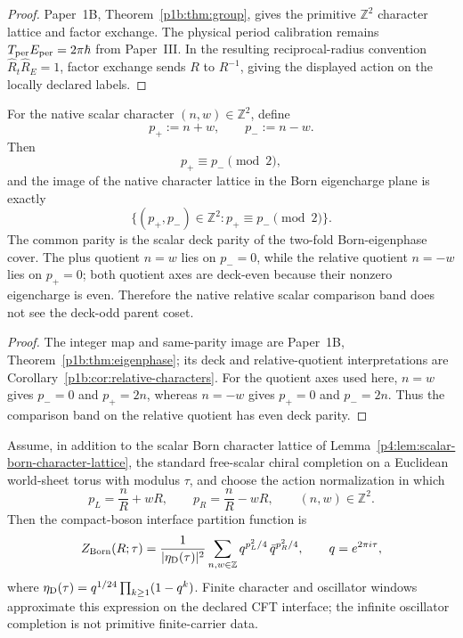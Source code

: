 \documentclass[12pt,a4paper]{article}
\begin{document}
\begin{proof}
Paper~1B, Theorem~\ref{p1b:thm:group}, gives the primitive
$\mathbb Z^2$ character lattice and factor exchange. The physical period
calibration remains $T_{\rm per}E_{\rm per}=2\pi\hbar$ from Paper~III.
In the resulting reciprocal-radius convention
$\widehat R_t\widehat R_E=1$, factor exchange sends $R$ to $R^{-1}$,
giving the displayed action on the locally declared labels.
\end{proof}


\begin{theorem}
\label{p4:thm:v190-born-eigencharge-lattice}
For the native scalar character $(n,w)\in\mathbb Z^2$, define
\[
 p_+:=n+w,\qquad p_-:=n-w.
\]
Then
\[
 \boxed{p_+\equiv p_-\pmod2,}
\]
and the image of the native character lattice in the Born eigencharge plane is
exactly
\[
 \boxed{\{(p_+,p_-)\in\mathbb Z^2:p_+\equiv p_-\pmod2\}.}
\]
The common parity is the scalar deck parity of the two-fold Born-eigenphase
cover.  The plus quotient $n=w$ lies on $p_-=0$, while the relative quotient
$n=-w$ lies on $p_+=0$; both quotient axes are deck-even because their
nonzero eigencharge is even.  Therefore the native relative scalar comparison
band does not see the deck-odd parent coset.
\end{theorem}

\begin{proof}
The integer map and same-parity image are Paper~1B,
Theorem~\ref{p1b:thm:eigenphase}; its deck and relative-quotient
interpretations are Corollary~\ref{p1b:cor:relative-characters}.
For the quotient axes used here, $n=w$ gives $p_-=0$ and $p_+=2n$,
whereas $n=-w$ gives $p_+=0$ and $p_-=2n$. Thus the comparison band
on the relative quotient has even deck parity.
\end{proof}

\begin{theorem}
\label{p4:thm:scalar-born-compact-boson-partition}
Assume, in addition to the scalar Born character lattice of
Lemma~\ref{p4:lem:scalar-born-character-lattice}, the standard free-scalar chiral
completion on a Euclidean world-sheet torus with modulus \(\tau\), and choose the
action normalization in which
\begin{equation}
\label{p4:eq:scalar-born-left-right-charges}
p_L=\frac nR+wR,
\qquad
p_R=\frac nR-wR,
\qquad
(n,w)\in\mathbb Z^2.
\end{equation}
Then the compact-boson interface partition function is
\begin{equation}
\label{p4:eq:scalar-born-compact-boson-partition}
Z_{\rm Born}(R;\tau)
=
\frac{1}{|\eta_{\rm D}(\tau)|^2}
\sum_{n,w\in\mathbb Z}
q^{p_L^2/4}\,\bar q^{p_R^2/4},
\qquad q=e^{2\pi i\tau},
\end{equation}
where \(\eta_{\rm D}(\tau)=q^{1/24}\prod_{k\ge1}(1-q^k)\).  Finite character and
oscillator windows approximate this expression on the declared CFT interface; the
infinite oscillator completion is not primitive finite-carrier data.
\end{theorem}
\end{document}
